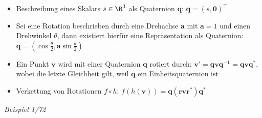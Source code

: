 \begin{itemize}
	\item Beschreibung eines Skalars $s\in\R^3$ als Quaternion $\mathbf{q}$: $\mathbf{q}=(s,\mathbf{0})^\top$
	\item Sei eine Rotation beschrieben durch eine Drehachse $\mathbf{a}$ mit $\mathbf{a}=1$ und einen Drehwinkel $\theta$, dann existiert hierfür eine Repräsentation als Quaternion: $\mathbf{q}=\left(\cos\frac{\theta}{2},\mathbf{a}\sin\frac{\theta}{2}\right)$
	\item Ein Punkt $\mathbf{v}$ wird mit einer Quaternion $\mathbf{q}$ rotiert durch:
	$\mathbf{v'}=\mathbf{qvq^{-1}}=\mathbf{qvq^{*}}$, wobei die letzte Gleichheit gilt, weil $\mathbf{q}$ ein Einheitsquaternion ist
	\item Verkettung von Rotationen $f\circ h$: $f(h(\mathbf{v}))=\mathbf{q}(\mathbf{rvr^*})\mathbf{q^*}$
\end{itemize}

\textit{Beispiel 1/72}\\

